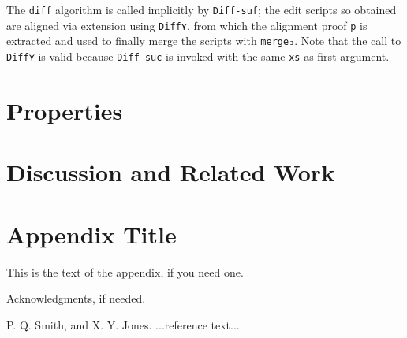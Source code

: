 \documentclass[preprint]{sigplanconf}
\begin{document}

	
	The \texttt{diff} algorithm is called implicitly by \texttt{Diff-suf}; the
	edit scripts so obtained are aligned via extension using 
	\texttt{Diff⋎}, from which the alignment proof \texttt{p} is extracted
	and used to finally merge the scripts with \texttt{merge₃}.
	Note that the call to \texttt{Diff⋎} is valid because \texttt{Diff-suc}
	is invoked with the same \texttt{xs} as first argument.

	
\section{Properties}

\section{Discussion and Related Work}

\appendix
\section{Appendix Title}

This is the text of the appendix, if you need one.

\acks

Acknowledgments, if needed.





\begin{thebibliography}{}
\softraggedright

P. Q. Smith, and X. Y. Jones. ...reference text...

\end{thebibliography}
\end{document}
